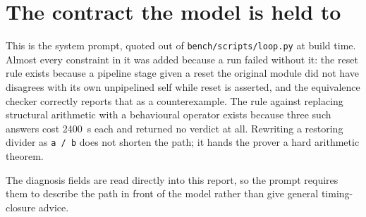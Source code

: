 \documentclass[11pt,a4paper]{article}
\begin{document}


\section{The contract the model is held to}

This is the system prompt, quoted out of \texttt{bench/scripts/loop.py} at
build time. Almost every constraint in it was added because a run failed
without it: the reset rule exists because a pipeline stage given a reset the
original module did not have disagrees with its own unpipelined self while
reset is asserted, and the equivalence checker correctly reports that as a
counterexample. The rule against replacing structural arithmetic with a
behavioural operator exists because three such answers cost \SI{2400}{\second}
each and returned no verdict at all. Rewriting a restoring divider as
\texttt{a / b} does not shorten the path; it hands the prover a hard arithmetic
theorem.

The diagnosis fields are read directly into this report, so the prompt requires
them to describe the path in front of the model rather than give general
timing-closure advice.


\end{document}
